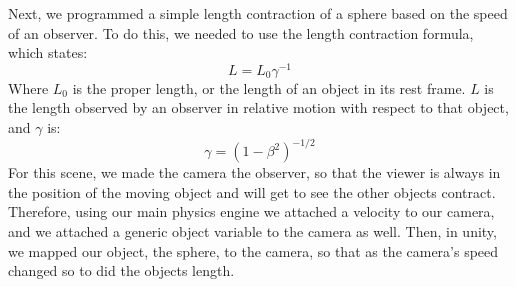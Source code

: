\documentclass[12pt]{article}
\begin{document}
Next, we programmed a simple length contraction of a sphere based on the speed of an observer. To do this, we needed to use the length contraction formula, which states:
\begin{equation}
L = L_0\gamma^{-1}
\end{equation}
Where $L_0$ is the proper length, or the length of an object in its rest frame. $L$ is the length observed by an observer in relative motion with respect to that object, and $\gamma$ is:
\begin{equation}
\gamma = (1-\beta^2)^{-1/2}
\end{equation}
For this scene, we made the camera the observer, so that the viewer is always in the position of the moving object and will get to see the other objects contract. Therefore, using our main physics engine we attached a velocity to our camera, and we attached a generic object variable to the camera as well. Then, in unity, we mapped our object, the sphere, to the camera, so that as the camera's speed changed so to did the objects length.
\inputminted[firstline=2,lastline=10,linenos,fontsize=\footnotesize]{csharp}{../unity/Assets/Scripts/CameraFollow.cs}





 
\end{document}
